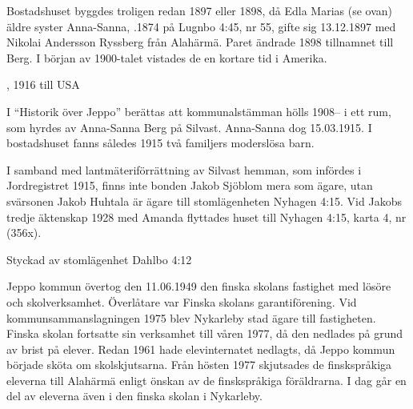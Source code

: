 %
Bostadshuset byggdes troligen redan 1897 eller 1898, då Edla Marias (se ovan) äldre syster Anna-Sanna, .1874 på Lugnbo 4:45, nr 55,	gifte sig 13.12.1897 med Nikolai Andersson Ryssberg från Alahärmä. Paret ändrade 1898 tillnamnet till Berg. I början av 1900-talet vistades de en kortare tid i Amerika.
\begin{jhchildren}
  \item {}, 1916 till USA
  \item {}
  \item {}
  \item {}
\end{jhchildren}
I ``Historik över Jeppo'' berättas att kommunalstämman hölls 1908-- i ett rum, som hyrdes av Anna-Sanna Berg på Silvast. Anna-Sanna dog 15.03.1915. I bostadshuset fanns således 1915 två familjers moderslösa barn.

I samband med lantmäteriförrättning av Silvast hemman, som infördes i Jordregistret 1915, finns inte bonden Jakob Sjöblom mera som ägare, utan svärsonen Jakob Huhtala är ägare till stomlägenheten Nyhagen 4:15. Vid Jakobs tredje äktenskap 1928 med Amanda flyttades huset till Nyhagen 4:15, karta 4, nr (356x).



%

Styckad av stomlägenhet Dahlbo 4:12


%
Jeppo kommun övertog den 11.06.1949 den finska skolans fastighet med lösöre och skolverksamhet. Överlåtare var Finska skolans garantiförening. Vid kommunsammanslagningen 1975 blev Nykarleby stad ägare till fastigheten. Finska skolan fortsatte sin verksamhet till våren 1977, då den nedlades på grund av brist på elever. Redan 1961 hade elevinternatet nedlagts, då Jeppo kommun började sköta om skolskjutsarna. Från hösten 1977 skjutsades de finskspråkiga eleverna till Alahärmä enligt önskan av de finskspråkiga föräldrarna. I dag går en del av eleverna även i den finska skolan i Nykarleby.

